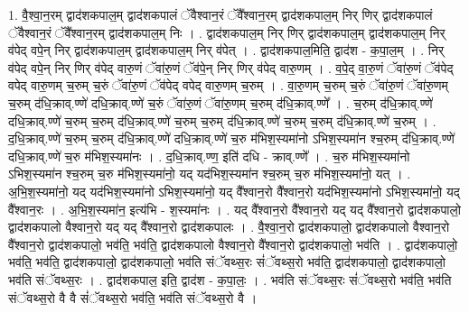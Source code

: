 \documentclass[17pt]{extarticle}
\begin{document}
1. वै॒श्वा॒न॒रम् द्वाद॑शकपाल॒म् द्वाद॑शकपालं ॅवैश्वान॒रं ॅवै᳚श्वान॒रम् द्वाद॑शकपाल॒म् निर् णिर् द्वाद॑शकपालं ॅवैश्वान॒रं ॅवै᳚श्वान॒रम् द्वाद॑शकपाल॒म् निः । . द्वाद॑शकपाल॒म् निर् णिर् द्वाद॑शकपाल॒म् द्वाद॑शकपाल॒म् निर् व॑पेद् वपे॒न् निर् द्वाद॑शकपाल॒म् द्वाद॑शकपाल॒म् निर् व॑पेत् । . द्वाद॑शकपाल॒मिति॒ द्वाद॑श - क॒पा॒ल॒म् । . निर् व॑पेद् वपे॒न् निर् णिर् व॑पेद् वारु॒णं ॅवा॑रु॒णं ॅव॑पे॒न् निर् णिर् व॑पेद् वारु॒णम् । . व॒पे॒द् वा॒रु॒णं ॅवा॑रु॒णं ॅव॑पेद् वपेद् वारु॒णम् च॒रुम् च॒रुं ॅवा॑रु॒णं ॅव॑पेद् वपेद् वारु॒णम् च॒रुम् । . वा॒रु॒णम् च॒रुम् च॒रुं ॅवा॑रु॒णं ॅवा॑रु॒णम् च॒रुम् द॑धि॒क्राव्.ण्णे॑ दधि॒क्राव्.ण्णे॑ च॒रुं ॅवा॑रु॒णं ॅवा॑रु॒णम् च॒रुम् द॑धि॒क्राव्.ण्णे᳚ । . च॒रुम् द॑धि॒क्राव्.ण्णे॑ दधि॒क्राव्.ण्णे॑ च॒रुम् च॒रुम् द॑धि॒क्राव्.ण्णे॑ च॒रुम् च॒रुम् द॑धि॒क्राव्.ण्णे॑ च॒रुम् च॒रुम् द॑धि॒क्राव्.ण्णे॑ च॒रुम् । . द॒धि॒क्राव्.ण्णे॑ च॒रुम् च॒रुम् द॑धि॒क्राव्.ण्णे॑ दधि॒क्राव्.ण्णे॑ च॒रु म॑भिश॒स्यमा॑नो ऽभिश॒स्यमा॑न श्च॒रुम् द॑धि॒क्राव्.ण्णे॑ दधि॒क्राव्.ण्णे॑ च॒रु म॑भिश॒स्यमा॑नः । . द॒धि॒क्राव्.ण्ण॒ इति॑ दधि - क्राव्.ण्णे᳚ । . च॒रु म॑भिश॒स्यमा॑नो ऽभिश॒स्यमा॑न श्च॒रुम् च॒रु म॑भिश॒स्यमा॑नो॒ यद् यद॑भिश॒स्यमा॑न श्च॒रुम् च॒रु म॑भिश॒स्यमा॑नो॒ यत् । . अ॒भि॒श॒स्यमा॑नो॒ यद् यद॑भिश॒स्यमा॑नो ऽभिश॒स्यमा॑नो॒ यद् वै᳚श्वान॒रो वै᳚श्वान॒रो यद॑भिश॒स्यमा॑नो ऽभिश॒स्यमा॑नो॒ यद् वै᳚श्वान॒रः । . अ॒भि॒श॒स्यमा॑न॒ इत्य॑भि - श॒स्यमा॑नः । . यद् वै᳚श्वान॒रो वै᳚श्वान॒रो यद् यद् वै᳚श्वान॒रो द्वाद॑शकपालो॒ द्वाद॑शकपालो वैश्वान॒रो यद् यद् वै᳚श्वान॒रो द्वाद॑शकपालः । . वै॒श्वा॒न॒रो द्वाद॑शकपालो॒ द्वाद॑शकपालो वैश्वान॒रो वै᳚श्वान॒रो द्वाद॑शकपालो॒ भव॑ति॒ भव॑ति॒ द्वाद॑शकपालो वैश्वान॒रो वै᳚श्वान॒रो द्वाद॑शकपालो॒ भव॑ति । . द्वाद॑शकपालो॒ भव॑ति॒ भव॑ति॒ द्वाद॑शकपालो॒ द्वाद॑शकपालो॒ भव॑ति संॅवथ्स॒रः सं॑ॅवथ्स॒रो भव॑ति॒ द्वाद॑शकपालो॒ द्वाद॑शकपालो॒ भव॑ति संॅवथ्स॒रः । . द्वाद॑शकपाल॒ इति॒ द्वाद॑श - क॒पा॒लः॒ । . भव॑ति संॅवथ्स॒रः सं॑ॅवथ्स॒रो भव॑ति॒ भव॑ति संॅवथ्स॒रो वै वै सं॑ॅवथ्स॒रो भव॑ति॒ भव॑ति संॅवथ्स॒रो वै । \newline
\end{document}
